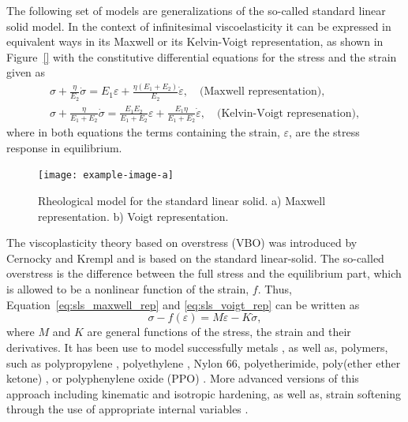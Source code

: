 The following set of models are generalizations of the so-called standard linear solid model.
In the context of infinitesimal viscoelasticity it can be expressed in equivalent ways in its Maxwell or its Kelvin-Voigt representation, as shown in Figure~\ref{} with the constitutive differential equations for the stress and the strain given as
\begin{gather}
	\sigma+\frac{\eta}{E_2} \dot{\sigma}=E_1 \varepsilon+\frac{\eta\left(E_1+E_2\right)}{E_2} \dot{\varepsilon},\quad\text{(Maxwell representation)},
	\label{eq:sls_maxwell_rep}\\
	\sigma+\frac{\eta}{E_1+E_2} \dot{\sigma}=\frac{E_1 E_2}{E_1+E_2} \varepsilon+\frac{E_1 \eta}{E_1+E_2} \dot{\varepsilon},\quad\text{(Kelvin-Voigt represenation)},
	\label{eq:sls_voigt_rep}
\end{gather}
where in both equations the terms containing the strain, $\varepsilon$, are the stress response in equilibrium.
\begin{figure}
	\centering
	\texttt{[image: example-image-a]}
	\caption{Rheological model for the standard linear solid. a) Maxwell representation. b) Voigt representation.}
\end{figure}

The viscoplasticity theory based on overstress (VBO) was introduced by Cernocky and Krempl \citep{cernockyTheoryViscoplasticityBased1980} and is based on the standard linear-solid.
The so-called overstress is the difference between the full stress and the equilibrium part, which is allowed to be a nonlinear function of the strain, $f$.
Thus, Equation~\eqref{eq:sls_maxwell_rep} and \eqref{eq:sls_voigt_rep} can be written as
\begin{equation}
	\sigma - f(\varepsilon) = M\dot\varepsilon - K\dot \sigma,
\end{equation}
where $M$ and $K$ are general functions of the stress, the strain and their derivatives.
It has been use to model successfully metals \citep{liuUniaxialViscoplasticModel1979, yaoViscoplasticityTheoryBased1985}, as well as, polymers, such as polypropylene \citep{kitagawaRatedependentNonlinearConstitutive1989}, polyethylene \citep{kitagawaNonlinearConstitutiveEquation1990}, Nylon 66, polyetherimide, poly(ether ether ketone) \citep{krempl2000overstress}, or polyphenylene oxide (PPO) \citep{colakModelingDeformationBehavior2005}.
More advanced versions of this approach including kinematic and isotropic hardening, as well as, strain softening through the use of appropriate internal variables \citep{krempl2000overstress, hoExtensionViscoplasticityTheory2002}.

